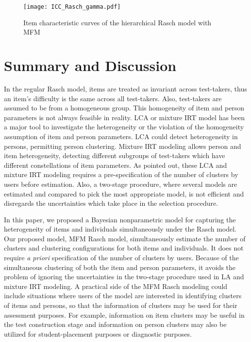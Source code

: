 \documentclass[12pt]{article}
\begin{document}
\begin{figure} [h!]
	\centering
	\texttt{[image: ICC\_Rasch\_gamma.pdf]}
	\caption{Item characteristic curves of the hierarchical Rasch model with MFM \label{fig:ICC}}
\end{figure}

\section{Summary and Discussion}\label{sec:discussion}

In the regular Rasch model, items are treated as invariant across test-takers, thus an item's difficulty is the same across all test-takers. Also, test-takers are assumed to be from a homogeneous group. This homogeneity of item and person parameters is not always feasible in reality. LCA or mixture IRT model has been a major tool to investigate the heterogeneity or the violation of the homogeneity assumption of item and person parameters. LCA could detect heterogeneity in persons, permitting person clustering. Mixture IRT modeling allows person and item heterogeneity, detecting different subgroups of test-takers which have different constellations of item parameters. As pointed out, these LCA and mixture IRT modeling requires a pre-specification of the number of clusters by users before estimation. Also, a two-stage procedure, where several models are estimated and compared to pick the most appropriate model, is not efficient and disregards the uncertainties which take place in the selection procedure. 

In this paper, we proposed a Bayesian nonparametric model for capturing the heterogeneity of items and individuals simultaneously under the Rasch model. Our proposed model, MFM Rasch model, simultaneously estimate the number of clusters and clustering configurations for both items and individuals. It does not require \textit{a priori} specification of the number of clusters by users. Because of the simultaneous clustering of both the item and person parameters, it avoids the problem of ignoring the uncertainties in the two-stage procedure used in LA and mixture IRT modeling. A practical side of the MFM Rasch modeling could include situations where users of the model are interested in identifying clusters of items and persons, so that the information of clusters may be used for their assessment purposes. For example, information on item clusters may be useful in the test construction stage and information on person clusters may also be utilized for student-placement purposes or diagnostic purposes.
\end{document}
